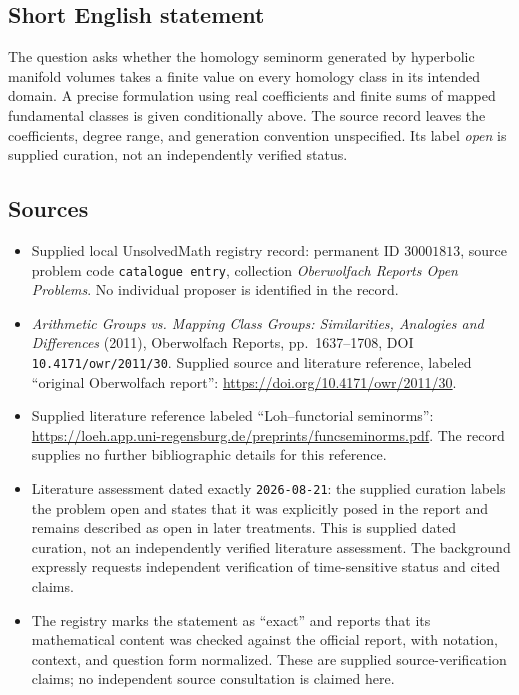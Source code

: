 \documentclass[11pt]{article}
\begin{document}
\subsection{Short English statement}
The question asks whether the homology seminorm generated by hyperbolic manifold volumes takes a finite value on every homology class in its intended domain. A precise formulation using real coefficients and finite sums of mapped fundamental classes is given conditionally above. The source record leaves the coefficients, degree range, and generation convention unspecified. Its label \emph{open} is supplied curation, not an independently verified status.
\subsection{Sources}
\begin{itemize}
\item Supplied local UnsolvedMath registry record: permanent ID \(30001813\), source problem code \texttt{catalogue entry}, collection \emph{Oberwolfach Reports Open Problems}. No individual proposer is identified in the record.
\item \emph{Arithmetic Groups vs. Mapping Class Groups: Similarities, Analogies and Differences} (2011), Oberwolfach Reports, pp.\ 1637--1708, DOI \texttt{10.4171/owr/2011/30}. Supplied source and literature reference, labeled ``original Oberwolfach report'': \url{https://doi.org/10.4171/owr/2011/30}.
\item Supplied literature reference labeled ``Loh--functorial seminorms'': \url{https://loeh.app.uni-regensburg.de/preprints/funcseminorms.pdf}. The record supplies no further bibliographic details for this reference.
\item Literature assessment dated exactly \texttt{2026-08-21}: the supplied curation labels the problem open and states that it was explicitly posed in the report and remains described as open in later treatments. This is supplied dated curation, not an independently verified literature assessment. The background expressly requests independent verification of time-sensitive status and cited claims.
\item The registry marks the statement as ``exact'' and reports that its mathematical content was checked against the official report, with notation, context, and question form normalized. These are supplied source-verification claims; no independent source consultation is claimed here.
\end{itemize}
\end{document}
